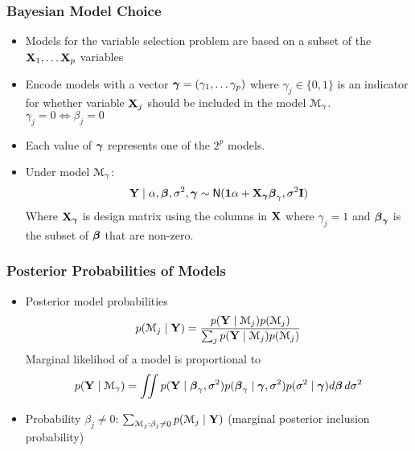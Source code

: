 \documentclass[handout]{beamer}\usepackage[]{graphicx}\usepackage[]{color}
\begin{document}
\begin{frame}\frametitle{Bayesian Model Choice}
  \begin{itemize}
  \item
Models for the variable selection problem  are based on a subset of
  the $\mathbf{X}_1, \ldots \mathbf{X}_p$ variables  \pause

\item Encode models with a  vector $\boldsymbol{\gamma} = (\gamma_1, \ldots
  \gamma_p)$  where  $\gamma_j \in \{0,1\}$
  is an indicator for whether variable $\mathbf{X}_j$ should be included in
  the model ${\cal M}_\gamma$.  $\gamma_j = 0 \Leftrightarrow \beta_j
  = 0$  \pause
\item Each value of $\boldsymbol{\gamma}$ represents one of the $2^p$ models.
\pause
\item Under model ${\cal M}_\gamma$:
 $$\mathbf{Y} \mid \alpha, \boldsymbol{\beta}, \sigma^2, \boldsymbol{\gamma} \sim \textsf{N}(\mathbf{1} \alpha + \mathbf{X}_{\boldsymbol{\gamma}} \boldsymbol{\beta}_\gamma,
 \sigma^2 \mathbf{I}) $$
Where $\mathbf{X}_{\boldsymbol{\gamma}}$ is design matrix  using the columns in $\mathbf{X}$ where
 $\gamma_j = 1$ and $\boldsymbol{\beta}_{\boldsymbol{\gamma}}$ is the subset of $\boldsymbol{\beta}$ that are non-zero.

\end{itemize}

\end{frame}


\begin{frame}\frametitle{Posterior Probabilities of Models}

  \begin{itemize}
  \item Posterior model probabilities
$$p({{\cal M}}_j \mid \mathbf{Y}) = \frac{ p(\mathbf{Y} \mid {{\cal M}}_j)p({{\cal M}}_j)}{\sum_jp(\mathbf{Y} \mid
  {{\cal M}}_j)p({{\cal M}}_j)} $$ \pause
Marginal likelihod of a model is proportional to
$$ p(\mathbf{Y} \mid {\cal M}_\gamma) = \iint p(\mathbf{Y} \mid \boldsymbol{\beta}_\gamma,
  \sigma^2)p(\boldsymbol{\beta}_\gamma \mid \boldsymbol{\gamma}, \sigma^2)p(\sigma^2 \mid \boldsymbol{\gamma})
  d\boldsymbol{\beta}\, d\sigma^2$$\pause
  \item Probability $\beta_j \ne 0$: $\sum_{{{\cal M}}_j:  \beta_j \ne 0}
    p({{\cal M}}_j \mid \mathbf{Y})$ (marginal posterior inclusion probability) \pause
  \end{itemize}
\end{frame}
\end{document}
